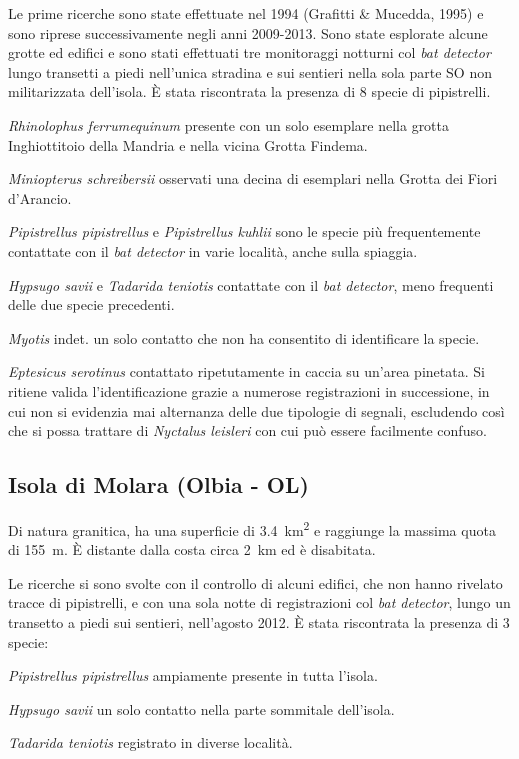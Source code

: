 \begin{multicols}{2}
\begin{compactdesc}
Le prime ricerche sono state effettuate nel 1994 (Grafitti \& Mucedda, 1995) e sono riprese successivamente negli anni 2009-2013. Sono state esplorate alcune grotte ed edifici e sono stati effettuati tre monitoraggi notturni col \textit{bat detector} lungo transetti a piedi nell’unica stradina e sui sentieri nella sola parte SO non militarizzata dell’isola.
È stata riscontrata la presenza di 8 specie di pipistrelli. 
\begin{compactdesc}
\item[\emph{Rhinolophus ferrumequinum}] presente con un solo esemplare nella grotta Inghiottitoio della Mandria e nella vicina Grotta Findema.
\item[\emph{Miniopterus schreibersii}] osservati una decina di esemplari nella Grotta dei Fiori d’Arancio.
\item[\emph{Pipistrellus pipistrellus} e \emph{Pipistrellus kuhlii}] sono le specie più frequentemente contattate con il \textit{bat detector} in varie località, anche sulla spiaggia.
\item[\emph{Hypsugo savii} e \emph{Tadarida teniotis}] contattate con il \textit{bat detector}, meno frequenti delle due specie precedenti. 
\item[\emph{Myotis} indet.] un solo contatto che non ha consentito di identificare la specie.
\item[\emph{Eptesicus serotinus}] contattato ripetutamente in caccia su un’area pinetata. Si ritiene valida l’identificazione grazie a numerose registrazioni in successione, in cui non si evidenzia mai alternanza delle due tipologie di segnali, escludendo così che si possa trattare di \emph{Nyctalus leisleri} con cui può essere facilmente confuso.
\end{compactdesc}

\subsection*{Isola di Molara (Olbia - OL)}
Di natura granitica, ha una superficie di \SI{3.4}{\square\kilo\meter} e raggiunge la massima quota di 155~m. È distante dalla costa circa 2~km ed è disabitata.

Le ricerche si sono svolte con il controllo di alcuni edifici, che non hanno rivelato tracce di pipistrelli, e con una sola notte di registrazioni col \textit{bat detector}, lungo un transetto a piedi sui sentieri, nell’agosto 2012. È stata riscontrata la presenza di 3 specie: 
\begin{compactdesc}
\item[\emph{Pipistrellus pipistrellus}] ampiamente presente in tutta l’isola. 
\item[\emph{Hypsugo savii}] un solo contatto nella parte sommitale dell’isola.
\item[\emph{Tadarida teniotis}] registrato in diverse località.
\end{compactdesc}


\end{compactdesc}
\end{multicols}
